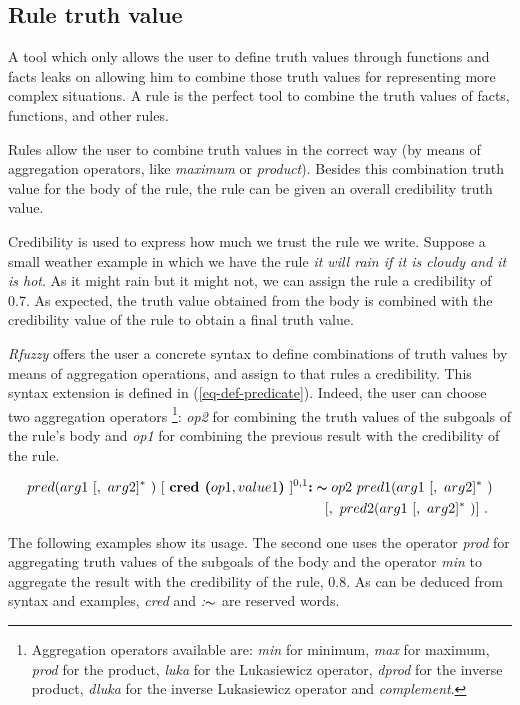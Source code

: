 \documentclass[runningheads,a4paper]{llncs}
\begin{document}
\subsection{Rule truth value}
\label{rule-truth-value}

A tool which only allows the user to define truth values through 
functions and facts leaks on allowing him to combine those 
truth values for representing more complex situations.
A rule is the perfect tool to combine the truth values
of facts, functions, and other rules.

Rules allow the user to combine truth values in the correct way
(by means of aggregation operators, 
like {\it maximum} or {\it product}).
Besides this combination truth value for the body of the rule, 
the rule can be given an overall credibility truth value.

Credibility is used to 
express how much we trust the rule we write.
Suppose a small weather example in which we have the rule
{\it it will rain if it is cloudy and it is hot}. 
As it might rain but it might not, 
we can assign the rule a credibility of 0.7. 
As expected, the truth value obtained from the body is combined with
the credibility value of the rule to obtain a final truth value.

{\it Rfuzzy} offers the user a concrete syntax to define combinations 
of truth values by means of aggregation operations, and assign to 
that rules a credibility. 
This syntax extension is defined in (\ref{eq-def-predicate}).
Indeed, the user can choose two aggregation 
operators \footnote{Aggregation operators available are: 
{\it min} for minimum, {\it max} for maximum,
{\it prod} for the product, {\it luka} for the Lukasiewicz operator,
{\it dprod} for the inverse product, {\it dluka} for the inverse
Lukasiewicz operator and {\it complement}.}:
{\it op2} for combining the truth values of the subgoals of 
the rule's body and {\it op1} for combining the previous result 
with the credibility of the rule.

\begin{eqnarray}
pred( arg1\ [,\ arg2]^*\ )\ [\ \textbf{cred\ (}op1, value1\textbf{)}\ ]^{0,1} \textbf{:} \thicksim 
op2~ pred1(arg1\ [,\ arg2]^*\ ) \nonumber \\
\ [,\ pred2(arg1\ [,\ arg2]^*\ ) ]\ .\ 
\label{eq-def-predicate}
\end{eqnarray}


The following examples show its usage. The second one uses 
the operator {\it prod} for aggregating truth values of the subgoals
of the body and the operator {\it min} to aggregate the result with the 
credibility of the rule, 0.8. 
As can be deduced from syntax and examples, 
{\it cred} and {\it :$\thicksim$} are reserved words.
\end{document}
